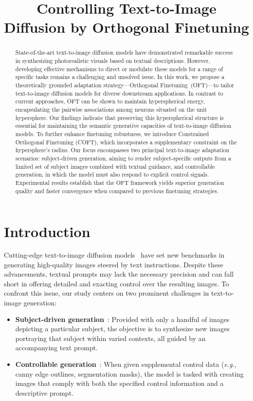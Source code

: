\title{Controlling Text-to-Image Diffusion by Orthogonal Finetuning}

\begin{abstract}
State-of-the-art text-to-image diffusion models have demonstrated remarkable success in synthesizing photorealistic visuals based on textual descriptions. However, developing effective mechanisms to direct or modulate these models for a range of specific tasks remains a challenging and unsolved issue. In this work, we propose a theoretically grounded adaptation strategy—Orthogonal Finetuning~(OFT)—to tailor text-to-image diffusion models for diverse downstream applications. In contrast to current approaches, OFT can be shown to maintain hyperspherical energy, encapsulating the pairwise associations among neurons situated on the unit hypersphere. Our findings indicate that preserving this hyperspherical structure is essential for maintaining the semantic generative capacities of text-to-image diffusion models. To further enhance finetuning robustness, we introduce Constrained Orthogonal Finetuning (COFT), which incorporates a supplementary constraint on the hypersphere's radius. Our focus encompasses two principal text-to-image adaptation scenarios: subject-driven generation, aiming to render subject-specific outputs from a limited set of subject images combined with textual guidance, and controllable generation, in which the model must also respond to explicit control signals. Experimental results establish that the OFT framework yields superior generation quality and faster convergence when compared to previous finetuning strategies.
\end{abstract}

\section{Introduction}

Cutting-edge text-to-image diffusion models~\cite{saharia2022photorealistic,ramesh2022hierarchical,rombach2022high} have set new benchmarks in generating high-quality images steered by text instructions. Despite these advancements, textual prompts may lack the necessary precision and can fall short in offering detailed and exacting control over the resulting images. To confront this issue, our study centers on two prominent challenges in text-to-image generation:

\begin{itemize}[leftmargin=*,nosep]

    \item \textbf{Subject-driven generation}~\cite{ruiz2023dreambooth}: Provided with only a handful of images depicting a particular subject, the objective is to synthesize new images portraying that subject within varied contexts, all guided by an accompanying text prompt.
    \item \textbf{Controllable generation}~\cite{zhang2023adding,mou2023t2i}: When given supplemental control data (\emph{e.g.}, canny edge outlines, segmentation masks), the model is tasked with creating images that comply with both the specified control information and a descriptive prompt.
\end{itemize}

